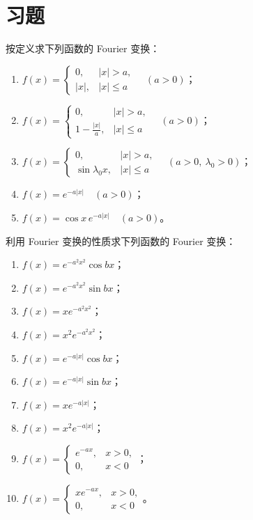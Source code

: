 \documentclass[../../main.tex]{subfiles}%
\begin{document}
\section{习题}

\begin{example}
按定义求下列函数的 Fourier 变换：
\begin{enumerate}[(1)]
\item $f(x)=\begin{cases}
0, & |x|>a,\\
|x|, & |x|\leqslant a
\end{cases}\quad (a>0)$；
\item $f(x)=\begin{cases}
0, & |x|>a,\\
1-\frac{|x|}{a}, & |x|\leqslant a
\end{cases}\quad (a>0)$；
\item $f(x)=\begin{cases}
0, & |x|>a,\\
\sin\lambda_0 x, & |x|\leqslant a
\end{cases}\quad (a>0,\ \lambda_0>0)$；
\item $f(x)=e^{-a|x|}\quad (a>0)$；
\item $f(x)=\cos x\,e^{-a|x|}\quad (a>0)$。
\end{enumerate}
\end{example}

\begin{example}
利用 Fourier 变换的性质求下列函数的 Fourier 变换：
\begin{enumerate}[(1)]
\item $f(x)=e^{-a^2x^2}\cos bx$；
\item $f(x)=e^{-a^2x^2}\sin bx$；
\item $f(x)=xe^{-a^2x^2}$；
\item $f(x)=x^2e^{-a^2x^2}$；
\item $f(x)=e^{-a|x|}\cos bx$；
\item $f(x)=e^{-a|x|}\sin bx$；
\item $f(x)=xe^{-a|x|}$；
\item $f(x)=x^2e^{-a|x|}$；
\item $f(x)=\begin{cases}
e^{-ax}, & x>0,\\
0, & x<0
\end{cases}$；
\item $f(x)=\begin{cases}
xe^{-ax}, & x>0,\\
0, & x<0
\end{cases}$。
\end{enumerate}
\end{example}
\end{document}
